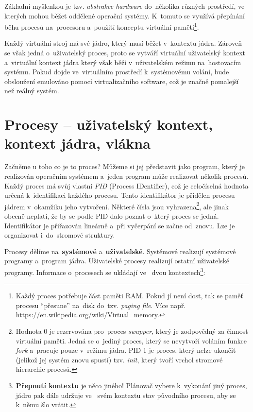 Základní myšlenkou je tzv. \emph{abstrakce hardware} do~několika různých prostředí, ve~ kterých mohou běžet oddělené operační systémy. K~tomuto se využívá přepínání běhu procesů na~procesoru a~použití konceptu virtuální paměti\footnote{Každý proces potřebuje část paměti RAM. Pokud jí není dost, tak se paměť procesu \enquote{přesune} na~disk do~tzv. \emph{paging file}. Více např. \url{https://en.wikipedia.org/wiki/Virtual_memory}.}.

Každý virtuální stroj má své jádro, který musí běžet v~kontextu jádra. Zároveň se však jedná o~uživatelský proces, proto se vytváří virtuální uživatelský kontext a~virtuální kontext jádra který však běží v~uživatelském režimu na~hostovacím systému. Pokud dojde ve~virtuálním prostředí k~systémovému volání, bude obsloužení emulováno pomocí virtualizačního software, což je značně pomalejší než reálný systém.


\clearpage
\section{Procesy -- uživatelský kontext, kontext jádra, vlákna} \label{procesy}

Začněme u toho co je to proces? Můžeme si jej představit jako program, který je realizován operačním systémem a~jeden program může realizovat několik procesů. Každý proces má svůj vlastní \emph{PID} (Process IDentifier), což je celočíselná hodnota určená k~identifikaci každého procesu. Tento identifikátor je přidělen procesu jádrem v~okamžiku jeho vytvoření. Některé čísla jsou vyhrazena\footnote{Hodnota 0 je rezervována pro~proces \emph{swapper}, který je zodpovědný za činnost virtuální paměti. Jedná se o~jediný proces, který se nevytvoří voláním funkce \emph{fork} a~pracuje pouze v~režimu jádra. PID 1 je proces, který nelze ukončit (jelikož jej systém znovu spustí) tzv. \emph{init}, který tvoří vrchol stromové hierarchie procesů.}, ale jinak obecně neplatí, že by se podle PID dalo poznat o~který proces se jedná. Identifikátor je přiřazován lineárně a~při vyčerpání se začne od~znovu. Lze je organizovat i~do~stromové struktury.

\vspace{0,5cm}
 
Procesy dělíme na~\textbf{systémové} a~\textbf{uživatelské}. Systémové realizují systémové programy a~program jádra. Uživatelské procesy realizují ostatní uživatelské programy.  Informace o~procesech se ukládají ve~ dvou kontextech\footnote{\textbf{Přepnutí kontextu} je něco jiného! Plánovač vybere k~vykonání jiný proces, jádro pak dále udržuje ve~ svém kontextu stav původního procesu, aby se k~němu šlo vrátit.}:

